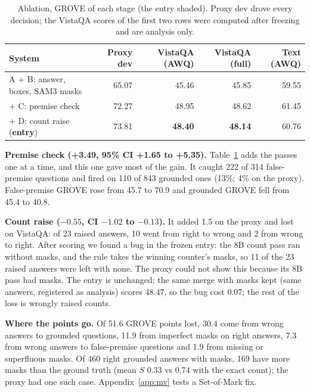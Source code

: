 \documentclass{article}
\newcommand{\ours}{\rowcolor{oursbg}}
\begin{document}
\begin{table}[t]
\centering\small
\caption{Ablation, GROVE of each stage (the entry shaded). Proxy dev drove every decision; the VistaQA scores of the first two
rows were computed after freezing and are analysis only.}
\label{tab:abl}
\begin{tabular}{lrrrr}
\toprule
System & Proxy dev & VistaQA (AWQ) & VistaQA (full) & Text (AWQ) \\
\midrule
A + B: answer, boxes, SAM3 masks & 65.07 & 45.46 & 45.85 & 59.55 \\
+ C: premise check & 72.27 & 48.95 & 48.62 & 61.45 \\
\ours + D: count raise (\textbf{entry}) & 73.81 & \textbf{48.40} & \textbf{48.14} & 60.76 \\
\bottomrule
\end{tabular}
\end{table}

\textbf{Premise check (+3.49, 95\% CI +1.65 to +5.35).} Table~\ref{tab:abl} adds the passes one at a time, and this one gave
most of the gain. It caught 222 of 314 false-premise questions and fired on 110 of 843
grounded ones (13\%; 4\% on the proxy). False-premise GROVE rose from 45.7 to 70.9 and grounded GROVE fell from 45.4 to 40.8.

\textbf{Count raise ($-0.55$, CI $-1.02$ to $-0.13$).} It added 1.5 on the proxy and lost on VistaQA: of 23 raised answers, 10
went from right to wrong and 2 from wrong to right. After scoring we found a bug in the frozen entry: the 8B count pass
ran without masks, and the rule takes the winning counter's masks, so 11 of the 23 raised answers were left with none. The
proxy could not show this because its 8B pass had masks. The entry is unchanged; the same merge with masks kept (same answers,
registered as analysis) scores 48.47, so the bug cost 0.07; the rest of the loss is wrongly raised counts.

\textbf{Where the points go.} Of 51.6 GROVE points lost, 30.4 come from wrong answers to grounded questions, 11.9 from imperfect
masks on right answers, 7.3 from wrong answers to false-premise questions and 1.9 from missing or superfluous masks. Of 460 right
grounded answers with masks, 169 have more masks than the ground truth (mean $S$ 0.33 vs 0.74 with the exact count);
the proxy had one such case. Appendix~\ref{app:mv} tests a Set-of-Mark fix.
\end{document}
